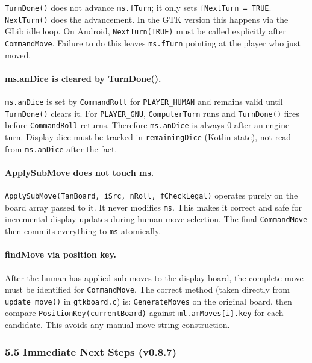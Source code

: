 \documentclass[11pt,a4paper]{article}
\begin{document}
\texttt{TurnDone()} does not advance \texttt{ms.fTurn}; it only sets
\texttt{fNextTurn = TRUE}. \texttt{NextTurn()} does the advancement.
In the GTK version this happens via the GLib idle loop. On Android,
\texttt{NextTurn(TRUE)} must be called explicitly after
\texttt{CommandMove}. Failure to do this leaves \texttt{ms.fTurn}
pointing at the player who just moved.

\paragraph{ms.anDice is cleared by TurnDone().}

\texttt{ms.anDice} is set by \texttt{CommandRoll} for \texttt{PLAYER\_HUMAN}
and remains valid until \texttt{TurnDone()} clears it. For
\texttt{PLAYER\_GNU}, \texttt{ComputerTurn} runs and \texttt{TurnDone()}
fires before \texttt{CommandRoll} returns. Therefore \texttt{ms.anDice}
is always 0 after an engine turn. Display dice must be tracked in
\texttt{remainingDice} (Kotlin state), not read from \texttt{ms.anDice}
after the fact.

\paragraph{ApplySubMove does not touch ms.}

\texttt{ApplySubMove(TanBoard, iSrc, nRoll, fCheckLegal)} operates
purely on the board array passed to it. It never modifies \texttt{ms}.
This makes it correct and safe for incremental display updates during
human move selection. The final \texttt{CommandMove} then commits
everything to \texttt{ms} atomically.

\paragraph{findMove via position key.}

After the human has applied sub-moves to the display board, the
complete move must be identified for \texttt{CommandMove}. The correct
method (taken directly from \texttt{update\_move()} in
\texttt{gtkboard.c}) is: \texttt{GenerateMoves} on the original board,
then compare \texttt{PositionKey(currentBoard)} against
\texttt{ml.amMoves[i].key} for each candidate. This avoids any manual
move-string construction.

\subsubsection{5.5 Immediate Next Steps (v0.8.7)}\label{next-steps-v085}
\end{document}
